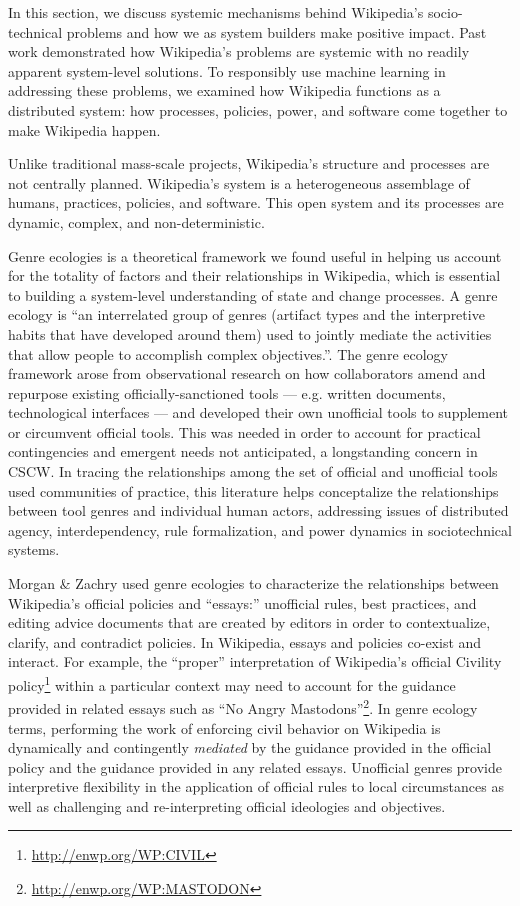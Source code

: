In this section, we discuss systemic mechanisms behind Wikipedia's socio-technical problems and how we as system builders make positive impact.  Past work demonstrated how Wikipedia's problems are systemic with no readily apparent system-level solutions. To responsibly use machine learning in addressing these problems, we examined how Wikipedia functions as a distributed system: how processes, policies, power, and software come together to make Wikipedia happen.

  Unlike traditional mass-scale projects, Wikipedia's structure and processes are not centrally planned. Wikipedia's system is a heterogeneous assemblage of humans, practices, policies, and software.  This open system and its processes are dynamic, complex, and non-deterministic.

Genre ecologies is a theoretical framework we found useful in helping us account for the totality of factors and their relationships in Wikipedia, which is essential to building a system-level understanding of state and change processes.  A genre ecology is ``an interrelated group of genres (artifact types and the interpretive habits that have developed around them) used to jointly mediate the activities that allow people to accomplish complex objectives.''\cite{spinuzzi2000genre}. The genre ecology framework arose from observational research on how collaborators amend and repurpose existing officially-sanctioned tools --- e.g. written documents, technological interfaces --- and developed their own unofficial tools to supplement or circumvent official tools. This was needed in order to account for practical contingencies and emergent needs not anticipated, a longstanding concern in CSCW. In tracing the relationships among the set of official and unofficial tools used communities of practice, this literature helps conceptalize the relationships between tool genres and individual human actors, addressing issues of distributed agency, interdependency, rule formalization, and power dynamics in sociotechnical systems\cite{spinuzzi2003tracing}.

Morgan \& Zachry used genre ecologies to characterize the relationships between Wikipedia's official policies and ``essays:'' unofficial rules, best practices, and editing advice documents that are created by editors in order to contextualize, clarify, and contradict policies\cite{morgan2010negotiating}. In Wikipedia, essays and policies co-exist and interact. For example, the ``proper'' interpretation of Wikipedia's official Civility policy\footnote{\url{http://enwp.org/WP:CIVIL}} within a particular context may need to account for the guidance provided in related essays such as ``No Angry Mastodons''\footnote{\url{http://enwp.org/WP:MASTODON}}. In genre ecology terms, performing the work of enforcing civil behavior on Wikipedia is dynamically and contingently \emph{mediated} by the guidance provided in the official policy and the guidance provided in any related essays. Unofficial genres provide interpretive flexibility in the application of official rules to local circumstances as well as challenging and re-interpreting official ideologies and objectives.

